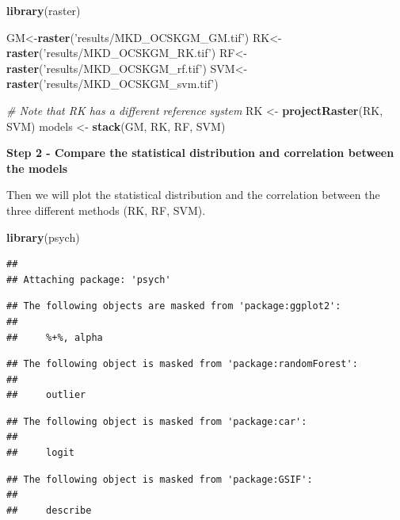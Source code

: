 \documentclass[10pt,b5paper,]{book}
\newenvironment{Shaded}{\begin{snugshade}}{\end{snugshade}}
\newcommand{\CommentTok}[1]{\textcolor[rgb]{0.56,0.35,0.01}{\textit{#1}}}
\newcommand{\KeywordTok}[1]{\textcolor[rgb]{0.13,0.29,0.53}{\textbf{#1}}}
\newcommand{\NormalTok}[1]{#1}
\newcommand{\StringTok}[1]{\textcolor[rgb]{0.31,0.60,0.02}{#1}}
\theoremstyle{definition}
\theoremstyle{definition}
\theoremstyle{definition}
\theoremstyle{remark}
\begin{document}
\begin{Shaded}
\begin{Highlighting}[]
\KeywordTok{library}\NormalTok{(raster)}

\NormalTok{GM<-}\KeywordTok{raster}\NormalTok{(}\StringTok{'results/MKD_OCSKGM_GM.tif'}\NormalTok{)}
\NormalTok{RK<-}\KeywordTok{raster}\NormalTok{(}\StringTok{'results/MKD_OCSKGM_RK.tif'}\NormalTok{)}
\NormalTok{RF<-}\KeywordTok{raster}\NormalTok{(}\StringTok{'results/MKD_OCSKGM_rf.tif'}\NormalTok{)}
\NormalTok{SVM<-}\KeywordTok{raster}\NormalTok{(}\StringTok{'results/MKD_OCSKGM_svm.tif'}\NormalTok{)}

\CommentTok{# Note that RK has a different reference system }
\NormalTok{RK <-}\StringTok{ }\KeywordTok{projectRaster}\NormalTok{(RK, SVM)}
\NormalTok{models <-}\StringTok{ }\KeywordTok{stack}\NormalTok{(GM, RK, RF, SVM)}
\end{Highlighting}
\end{Shaded}

\textbf{Step 2 - Compare the statistical distribution and correlation
between the models}

Then we will plot the statistical distribution and the correlation
between the three different methods (RK, RF, SVM).

\begin{Shaded}
\begin{Highlighting}[]
\KeywordTok{library}\NormalTok{(psych)}
\end{Highlighting}
\end{Shaded}

\begin{verbatim}
## 
## Attaching package: 'psych'
\end{verbatim}

\begin{verbatim}
## The following objects are masked from 'package:ggplot2':
## 
##     %+%, alpha
\end{verbatim}

\begin{verbatim}
## The following object is masked from 'package:randomForest':
## 
##     outlier
\end{verbatim}

\begin{verbatim}
## The following object is masked from 'package:car':
## 
##     logit
\end{verbatim}

\begin{verbatim}
## The following object is masked from 'package:GSIF':
## 
##     describe
\end{verbatim}
\end{document}
